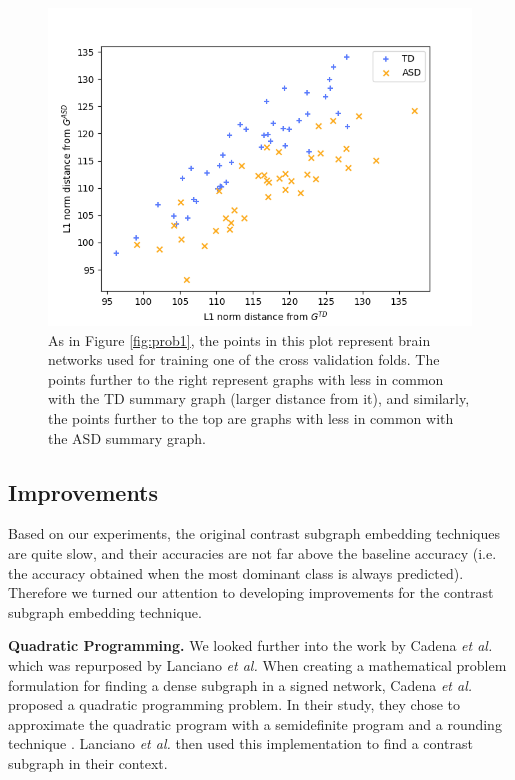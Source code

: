 \documentclass[sigconf]{acmart}
\begin{document}
\begin{figure}
    \centering
    \includegraphics[width=\columnwidth, keepaspectratio=true]{img/CSP2-SDP-Percentile-Children-4-train-labels.png}
    \caption{As in Figure \ref{fig:prob1}, the points in this plot represent brain networks used for training one of the cross validation folds. The points further to the right represent graphs with less in common with the TD summary graph (larger distance from it), and similarly, the points further to the top are graphs with less in common with the ASD summary graph.}
    \label{fig:prob2}
\end{figure}




\subsection{Improvements} \label{improvements}

Based on our experiments, the original contrast subgraph embedding techniques are quite slow, and their accuracies are not far above the baseline accuracy (i.e. the accuracy obtained when the most dominant class is always predicted).
Therefore we turned our attention to developing improvements for the contrast subgraph embedding technique.

\textbf{Quadratic Programming.}
We looked further into the work by Cadena \emph{et al.} which was repurposed by Lanciano \emph{et al.}
When creating a mathematical problem formulation for finding a dense subgraph in a signed network, Cadena \emph{et al.} proposed a quadratic programming problem.
In their study, they chose to approximate the quadratic program with a semidefinite program and a rounding technique \cite{cadena2016}.
Lanciano \emph{et al.} then used this implementation to find a contrast subgraph in their context.
\end{document}
